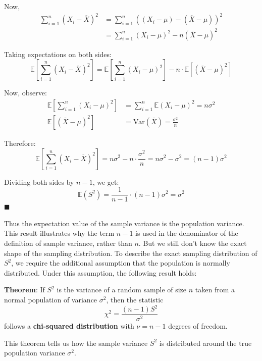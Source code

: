 \documentclass[twoside]{book}
\begin{document}
Now,
\begin{align*}
\sum_{i=1}^{n} (X_i - \overline{X})^2 &= \sum_{i=1}^{n} \left( (X_i - \mu) - (\overline{X} - \mu)\right) ^2\\
&= \sum_{i=1}^{n} (X_i - \mu)^2 - n(\overline{X} - \mu)^2
\end{align*}

Taking expectations on both sides:
\[
\mathbb{E}\left[\sum_{i=1}^{n} (X_i - \overline{X})^2 \right] = \mathbb{E}\left[ \sum_{i=1}^{n} (X_i - \mu)^2 \right] - n \cdot \mathbb{E}\left[(\overline{X} - \mu)^2 \right]
\]

Now, observe:
\begin{align*}
\mathbb{E}\left[\sum_{i=1}^{n} (X_i - \mu)^2 \right] &= \sum_{i=1}^{n} \mathbb{E}(X_i - \mu)^2 = n\sigma^2 \\
\mathbb{E}\left[(\overline{X} - \mu)^2 \right] &= \text{Var}(\overline{X}) = \frac{\sigma^2}{n}
\end{align*}

Therefore:
\[
\mathbb{E}\left[\sum_{i=1}^{n} (X_i - \overline{X})^2 \right] = n\sigma^2 - n \cdot \frac{\sigma^2}{n} = n\sigma^2 - \sigma^2 = (n - 1)\sigma^2
\]

Dividing both sides by \( n - 1 \), we get:
\[
\mathbb{E}(S^2) = \frac{1}{n - 1} \cdot (n - 1)\sigma^2 = \sigma^2
\]
\hfill $\blacksquare$

Thus the expectation value of the sample variance is the population variance. This result illustrates why the term \( n - 1 \) is used in the denominator of the definition of sample variance, rather than \( n \).
But we still don't know the exact shape of the sampling distribution. To describe the exact sampling distribution of \( S^2 \), we require the additional assumption that the population is normally distributed. Under this assumption, the following result holds:


\begin{textbox}
\textbf{Theorem}: If $S^2$ is the variance of a random sample of size $n$ taken from a normal population of variance $\sigma^2$, then the statistic
\[
\chi^2 = \frac{(n - 1)S^2}{\sigma^2}
\]
follows a \textbf{chi-squared distribution} with \( \nu = n - 1 \) degrees of freedom.
\end{textbox}

This theorem tells us how the sample variance \( S^2 \) is distributed around the true population variance \( \sigma^2 \).
\end{document}
